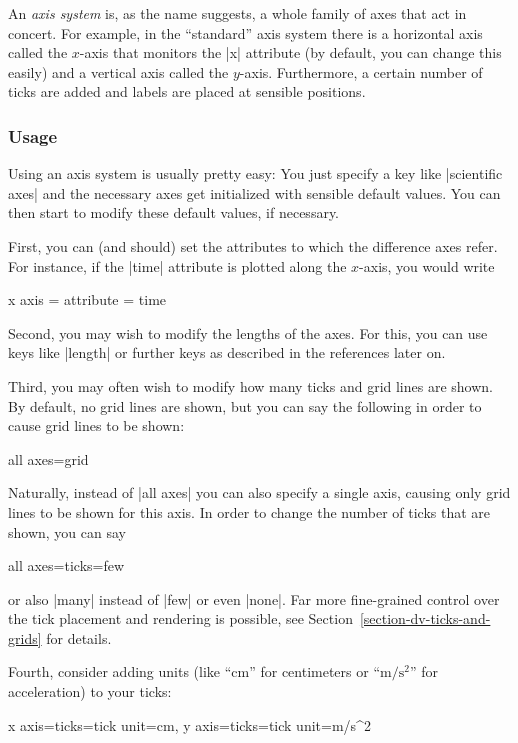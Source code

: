 An \emph{axis system} is, as the name suggests, a whole family of axes that act
in concert. For example, in the ``standard'' axis system there is a horizontal
axis called the $x$-axis that monitors the |x| attribute (by default, you can
change this easily) and a vertical axis called the $y$-axis. Furthermore, a
certain number of ticks are added and labels are placed at sensible positions.


\subsubsection{Usage}

Using an axis system is usually pretty easy: You just specify a key like
|scientific axes| and the necessary axes get initialized with sensible default
values. You can then start to modify these default values, if necessary.

First, you can (and should) set the attributes to which the difference axes
refer. For instance, if the |time| attribute is plotted along the $x$-axis, you
would write
%
\begin{codeexample}
x axis = {attribute = time}
\end{codeexample}

Second, you may wish to modify the lengths of the axes. For this, you can use
keys like |length| or further keys as described in the references later on.

Third, you may often wish to modify how many ticks and grid lines are shown. By
default, no grid lines are shown, but you can say the following in order to
cause grid lines to be shown:
%
\begin{codeexample}
all axes={grid}
\end{codeexample}
%
Naturally, instead of |all axes| you can also specify a single axis, causing
only grid lines to be shown for this axis. In order to change the number of
ticks that are shown, you can say
%
\begin{codeexample}
all axes={ticks=few}
\end{codeexample}
%
or also |many| instead of |few| or even |none|. Far more fine-grained control
over the tick placement and rendering is possible, see
Section~\ref{section-dv-ticks-and-grids} for details.

Fourth, consider adding units (like ``cm'' for centimeters or
``$\mathrm{m}/\mathrm{s}^2$'' for acceleration) to your ticks:
%
\begin{codeexample}
x axis={ticks={tick unit=cm}}, y axis={ticks={tick unit=m/s^2}}
\end{codeexample}

